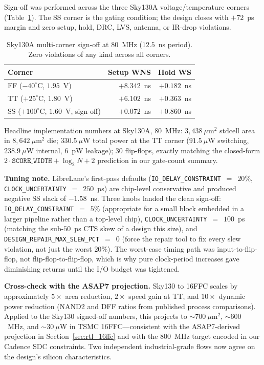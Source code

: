 \documentclass[10pt,twocolumn]{article}
\begin{document}
Sign-off was performed across the three Sky130A voltage/temperature
corners (Table~\ref{tab:sky130_corners}). The SS corner is the
gating condition; the design closes with $+72$~ps margin and zero
setup, hold, DRC, LVS, antenna, or IR-drop violations.

\begin{table}[h]
  \centering
  \small
  \caption{Sky130A multi-corner sign-off at $80$~MHz ($12.5$~ns
    period). Zero violations of any kind across all corners.}
  \label{tab:sky130_corners}
  \begin{tabular}{lrr}
    \toprule
    Corner & Setup WNS & Hold WS \\
    \midrule
    FF ($-40^\circ$C, $1.95$~V) & $+8.342$~ns & $+0.182$~ns \\
    TT ($+25^\circ$C, $1.80$~V) & $+6.102$~ns & $+0.363$~ns \\
    SS ($+100^\circ$C, $1.60$~V, sign-off) &
       $\mathbf{+0.072}$~ns & $+0.860$~ns \\
    \bottomrule
  \end{tabular}
\end{table}

Headline implementation numbers at Sky130A, $80$~MHz:
$3{,}438~\mu$m$^2$ stdcell area in $8{,}642~\mu$m$^2$ die;
$330.5~\mu$W total power at the TT corner ($91.5~\mu$W switching,
$238.9~\mu$W internal, $6$~pW leakage); $30$ flip-flops, exactly
matching the closed-form
$2\!\cdot\!\texttt{SCORE\_WIDTH} + \log_2 N + 2$ prediction in our
gate-count summary.

\textbf{Tuning note.} LibreLane's first-pass defaults
(\texttt{IO\_DELAY\_CONSTRAINT}~$=$~$20\%$,
\texttt{CLOCK\_UNCERTAINTY}~$=$~$250$~ps) are chip-level conservative
and produced negative SS slack of $-1.58$~ns. Three knobs landed the
clean sign-off: \texttt{IO\_DELAY\_CONSTRAINT}~$=$~$5\%$ (appropriate
for a small block embedded in a larger pipeline rather than a top-level
chip), \texttt{CLOCK\_UNCERTAINTY}~$=$~$100$~ps (matching the
sub-$50$~ps CTS skew of a design this size), and
\texttt{DESIGN\_REPAIR\_MAX\_SLEW\_PCT}~$=$~$0$ (force the repair
tool to fix every slew violation, not just the worst $20\%$). The
worst-case timing path was input-to-flip-flop, not flip-flop-to-flip-flop,
which is why pure clock-period increases gave diminishing returns
until the I/O budget was tightened.

\textbf{Cross-check with the ASAP7 projection.} Sky130 to 16FFC
scales by approximately $5\times$ area reduction, $2\times$ speed
gain at TT, and $10\times$ dynamic power reduction (NAND2 and DFF
ratios from published process comparisons). Applied to the Sky130
signed-off numbers, this projects to $\sim\!700~\mu$m$^2$,
$\sim\!600$~MHz, and $\sim\!30~\mu$W in TSMC 16FFC---consistent with
the ASAP7-derived projection in Section~\ref{sec:rtl_16ffc} and with
the $800$~MHz target encoded in our Cadence SDC constraints. Two
independent industrial-grade flows now agree on the design's silicon
characteristics.
\end{document}
